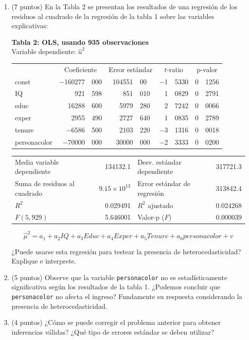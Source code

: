 \documentclass[10pt,a4paper]{article}
\begin{document}
\begin{enumerate}
\begin{enumerate}
    \item (7 puntos)  En la Tabla 2 se presentan los resultados de una regresión de los residuos al cuadrado de la regresión de la tabla 1 sobre las variables explicativas:

\newpage
\begin{center}
\textbf{Tabla 2: OLS, usando 935 observaciones} \\
Variable dependiente: $\hat{u}^2$ \\
\vspace{1em}
\begin{tabular}{lr@{.}lr@{.}lr@{.}lr@{.}l}
 & \multicolumn{2}{c}{Coeficiente} & \multicolumn{2}{c}{Error estándar} & \multicolumn{2}{c}{$t$-ratio} & \multicolumn{2}{c}{p-valor} \\[1ex]
const          & $-$160277&000 & 104551&00 & $-$1&5330 & 0&1256 \\
IQ             & 921&598   & 851&010  & 1&0829  & 0&2791 \\
educ           & 16288&600 & 5979&280 & 2&7242  & 0&0066 \\
exper          & 2955&490  & 2727&640 & 1&0835  & 0&2789 \\
tenure         & $-$6586&500 & 2103&220 & $-$3&1316 & 0&0018 \\
personacolor   & $-$70000&000 & 30000&000 & $-$2&3333 & 0&0200 \\
\end{tabular}

\vspace{1ex}
\begin{tabular}{lrlr}
Media variable dependiente & 134132.1 & Desv. estándar dependiente & 317721.3 \\
Suma de residuos al cuadrado & $9.15 \times 10^{13}$ & Error estándar de regresión & 313842.4 \\
$R^2$ & 0.029491 & $R^2$ ajustado & 0.024268 \\
$F(5, 929)$ & 5.646001 & Valor-p ($F$) & 0.000039 \\
\end{tabular}
\end{center}


    \[
    \hat{\mu}^2 = a_1 + a_2 IQ + a_3 Educ + a_4 Exper + a_5 Tenure + a_6 personacolor + v
    \]

    ¿Puede usarse esta regresión para testear la presencia de heterocedasticidad? Explique e interprete.

      \item (5 puntos) Observe que la variable \texttt{personacolor} no es estadísticamente significativa según los resultados de la tabla 1. ¿Podemos concluir que \texttt{personacolor} no afecta el ingreso? Fundamente su respuesta considerando la presencia de heterocedasticidad. 

        \item (4 puntos) ¿Cómo se puede corregir el problema anterior para obtener inferencias válidas? ¿Qué tipo de errores estándar se deben utilizar? 

   
\end{enumerate}

\end{enumerate}
\end{document}
